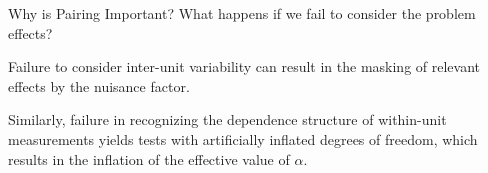 
\begin{frame}[fragile]{Why is Pairing Important?}
What happens if we fail to consider the problem effects?
{}
\bigskip

Failure to consider inter-unit variability can result in the masking of relevant effects by the nuisance factor.
\bigskip

Similarly, failure in recognizing the dependence structure of within-unit measurements yields tests with artificially inflated degrees of freedom, which results in the inflation of the effective value of $\alpha$.
\end{frame}

%

